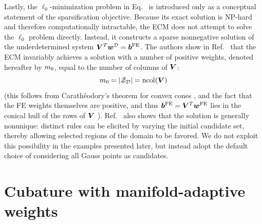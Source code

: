 \documentclass[preprint,10pt]{elsarticle}  %
\begin{document}
Lastly, the \(\ell_0\)-minimization problem in
Eq.~ is introduced only as a
conceptual statement of the sparsification objective. Because its exact
solution is NP-hard and therefore computationally intractable, the ECM
does not attempt to solve the \(\ell_0\) problem directly. Instead, it
constructs a sparse nonnegative solution of the underdetermined system
\(\bm{V}^T\bm{w}^{\mathcal{D}}=\bm{b}^{\mathrm{FE}}\). The authors show  in Ref.~\cite{bravo2024subspace} that the ECM invariably achieves a solution with a number of positive weights, denoted hereafter by $m_0$, equal to the number of columns of $\bm{V}$:
\begin{equation}
\label{eq:mInit_fixed_ECM}
m_0=|\mathcal{Z}_{\mathcal{D}}|=\operatorname{ncol}(\bm{V})
\end{equation}
(this follows from Carathéodory's theorem for convex cones
\cite[\S~17]{rockafellar1996convex}, and the fact that the FE weights themselves are positive, and thus \(\bm{b}^{\mathrm{FE}}=\bm{V}^T\bm{w}^{\mathrm{FE}}\)  lies  in the conical hull of the rows of \(\bm{V}\)  ).    Ref.~\cite{bravo2024subspace} also shows  that the solution is generally nonunique:
distinct rules
can be elicited by varying the initial candidate set, thereby allowing
selected regions of the domain to be favored. We do not exploit this
possibility in the examples presented later, but instead adopt the
default choice of considering all Gauss points as candidates.





\section{Cubature with manifold-adaptive weights}
\label{sec:MAWECM}
\end{document}
